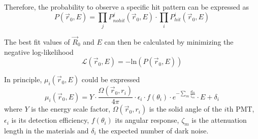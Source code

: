 \documentclass[../main.tex]{subfiles}
\begin{document}
Therefore, the probability to observe a specific hit pattern can be expressed as
\begin{equation}
  P(\vec{r}_0, E) = \prod_j P^j_{nohit}(\vec{r}_0, E) \cdot \prod_i P^i_{hit}(\vec{r}_0, E)
\end{equation}

The best fit values of $\vec{R}_0$ and $E$ can then be calculated by minimizing the negative log-likelihood
\begin{equation}
  \label{eq:juno:rec:charge_likelihood}
  \mathcal{L}(\vec{r}_0, E) = - \mathrm{ln}(P(\vec{r}_0,E))
\end{equation}

In principle, $\mu_i(\vec{r}_0, E)$ could be expressed
\begin{equation}
  \label{eq:juno:rec:mu_i}
  \mu_i(\vec{r}_0, E) = Y \cdot \frac{\Omega(\vec{r}_0, r_i)}{4 \pi} \cdot \epsilon_i \cdot f(\theta_i) \cdot e^{-\sum_m \frac{d_m}{\zeta_m}}\cdot E + \delta_i
\end{equation}
where $Y$ is the energy scale factor, $\Omega(\vec{r}_0, r_i)$ is the solid angle of the $i$th PMT, $\epsilon_i$ is its detection efficiency, $f(\theta_i)$ its angular response, $\zeta_m$ is the attenuation length in the materials and $\delta_i$ the expected number of dark noise.
\end{document}
